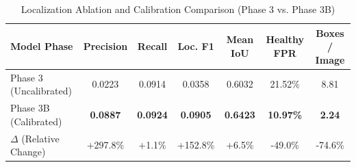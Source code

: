 \begin{table}[t]
\centering
\caption{Localization Ablation and Calibration Comparison (Phase 3 vs. Phase 3B)}
\label{tab:localization_results}
\small
\setlength{\tabcolsep}{10pt}
\begin{tabular}{lcccccc}
\toprule
\textbf{Model Phase} & \textbf{Precision} & \textbf{Recall} & \textbf{Loc. F1} & \textbf{Mean IoU} & \textbf{Healthy FPR} & \textbf{Boxes / Image} \\
\midrule
Phase 3 (Uncalibrated) & 0.0223 & 0.0914 & 0.0358 & 0.6032 & 21.52\% & 8.81 \\
Phase 3B (Calibrated) & \textbf{0.0887} & \textbf{0.0924} & \textbf{0.0905} & \textbf{0.6423} & \textbf{10.97\%} & \textbf{2.24} \\
\midrule
$\Delta$ (Relative Change) & +297.8\% & +1.1\% & +152.8\% & +6.5\% & -49.0\% & -74.6\% \\
\bottomrule
\end{tabular}
\end{table}


